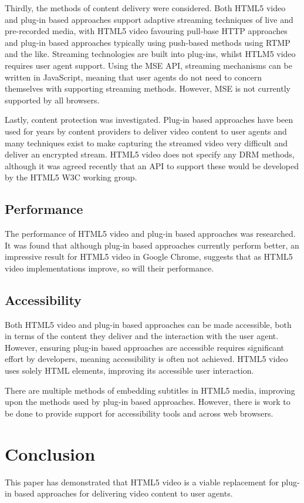 \documentclass[journal]{IEEEtran}
\begin{document}
Thirdly, the methods of content delivery were considered. Both HTML5 video and plug-in based approaches support adaptive streaming techniques of live and pre-recorded media, with HTML5 video favouring pull-base HTTP approaches and plug-in based approaches typically using push-based methods using RTMP and the like. Streaming technologies are built into plug-ins, whilst HTLM5 video requires user agent support. Using the MSE API, streaming mechanisms can be written in JavaScript, meaning that user agents do not need to concern themselves with supporting streaming methods. However, MSE is not currently supported by all browsers.

Lastly, content protection was investigated. Plug-in based approaches have been used for years by content providers to deliver video content to user agents and many techniques exist to make capturing the streamed video very difficult and deliver an encrypted stream. HTML5 video does not specify any DRM methods, although it was agreed recently that an API to support these would be developed by the HTML5 W3C working group.

\subsection{Performance}
The performance of HTML5 video and plug-in based approaches was researched. It was found that although plug-in based approaches currently perform better, an impressive result for HTML5 video in Google Chrome, suggests that as HTML5 video implementations improve, so will their performance. 

\subsection{Accessibility}
Both HTML5 video and plug-in based approaches can be made accessible, both in terms of the content they deliver and the interaction with the user agent. However, ensuring plug-in based approaches are accessible requires significant effort by developers, meaning accessibility is often not achieved. HTML5 video uses solely HTML elements, improving its accessible user interaction.

There are multiple methods of embedding subtitles in HTML5 media, improving upon the methods used by plug-in based approaches. However, there is work to be done to provide support for accessibility tools and across web browsers.

\section{Conclusion}
This paper has demonstrated that HTML5 video is a viable replacement for plug-in based approaches for delivering video content to user agents.
\end{document}

